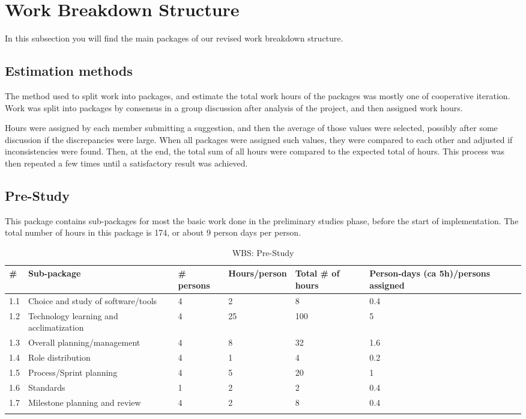 \section{Work Breakdown Structure}
In this subsection you will find the main packages of our revised work breakdown structure.

\subsection{Estimation methods}

The method used to split work into packages, and estimate the total work hours of the packages was mostly one of cooperative iteration. Work was split into packages by consensus in a group discussion after analysis of the project, and then assigned work hours.

Hours were assigned by each member submitting a suggestion, and then the average of those values were selected, possibly after some discussion if the discrepancies were large. When all packages were assigned such values, they were compared to each other and adjusted if inconsistencies were found. Then, at the end, the total sum of all hours were compared to the expected total of hours. This process was then repeated a few times until a satisfactory result was achieved.

\subsection{Pre-Study}
This package contains sub-packages for most the basic work done in the preliminary studies phase, before the start of implementation. The total number of hours in this package is 174, or about 9 person days per person.
\begin{longtable}{|p{0.7cm}|p{3cm}|p{1.8cm}|p{2.5cm}|p{2cm}|p{2.8cm}|}
\hline
\# & Sub-package & \# persons & Hours/person & Total \# of hours & Person-days (ca 5h)/persons assigned\\ 
\hline
1.1 & Choice and study of software/tools & 4 & 2 & 8 & 0.4\\ 
\hline
1.2 & Technology learning and acclimatization & 4 & 25 & 100 & 5\\ 
\hline
1.3 & Overall planning/management & 4 & 8 & 32 & 1.6\\ 
\hline
1.4 & Role distribution & 4 & 1 & 4 & 0.2\\ 
\hline
1.5 & Process/Sprint planning & 4 & 5 & 20 & 1\\ 
\hline
1.6 & Standards & 1 & 2 & 2 & 0.4\\ 
\hline
1.7 & Milestone planning and review & 4 & 2 & 8 & 0.4\\ 
\hline
\caption{WBS: Pre-Study}
\end{longtable}

